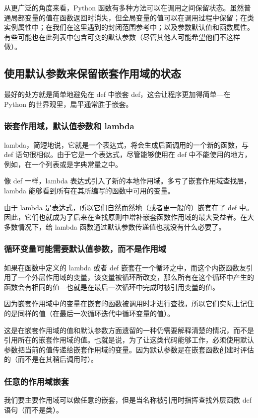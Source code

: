 从更广泛的角度来看，Python 函数有多种方法可以在调用之间保留状态。虽然普通局部变量的值在函数返回时消失，但全局变量的值可以在调用过程中保留；在类实例属性中；在我们在这里遇到的封闭范围参考中；以及参数默认值和函数属性。有些可能也在此列表中包含可变的默认参数（尽管其他人可能希望他们不这样做）。
\subsection{使用默认参数来保留嵌套作用域的状态}
最好的处方就是简单地避免在 def 中嵌套 def，这会让程序更加得简单---在 Python 的世界观里，扁平通常胜于嵌套。
\subsubsection*{嵌套作用域，默认值参数和 lambda}
lambda，简短地说，它就是一个表达式，将会生成后面调用的一个新的函数，与 def 语句很相似。由于它是一个表达式，尽管能够使用在 def 中不能使用的地方，例如，在一个列表或是字典常量之中。

像 def 一样，lambda 表达式引入了新的本地作用域。多亏了嵌套作用域查找层，lambda 能够看到所有在其所编写的函数中可用的变量。

由于 lambda 是表达式，所以它们自然而然地（或者更一般的）嵌套在了 def 中。因此，它们也就成为了后来在查找原则中增补嵌套函数作用域的最大受益者。在大多数情况下，给 lambda 函数通过默认参数传递值也就没有什么必要了。

\subsubsection*{循环变量可能需要默认值参数，而不是作用域}
如果在函数中定义的 lambda 或者 def 嵌套在一个循环之中，而这个内嵌函数友引用了一个外层作用域的变量，该变量被循环所改变，那么所有在这个循环中产生的函数会有相同的值---也就是在最后一次循环中完成时被引用变量的值。
\begin{tcolorbox}
    因为嵌套作用域中的变量在嵌套的函数被调用时才进行查找，所以它们实际上记住的是同样的值（在最后一次循环迭代中循环变量的值）。
\end{tcolorbox}

这是在嵌套作用域的值和默认参数方面遗留的一种仍需要解释清楚的情况，而不是引用所在的嵌套作用域的值。也就是说，为了让这类代码能够工作，必须使用默认参数把当前的值传递给嵌套作用域的变量。因为默认参数是在嵌套函数创建时评估的（而不是在其稍后调用时）。

\subsubsection*{任意的作用域嵌套}
我们要主要作用域可以做任意的嵌套，但是当名称被引用时指挥查找外层函数 def 语句（而不是类）。
